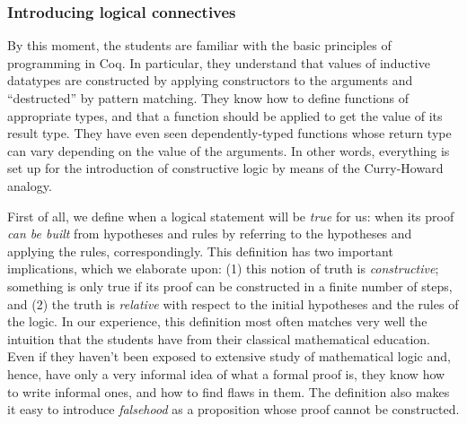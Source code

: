 \documentclass[blockstyle,preprint]{sigplanconf}
\newcommand{\an}[1]{\textcolor{red}{(Aleks: {#1})}}
\begin{document}
\subsubsection{Introducing logical connectives}
\label{sec:intr-logic-conn}

By this moment, the students are familiar with the basic principles of
programming in Coq. In particular, they understand that values of
inductive datatypes are constructed by applying constructors to the
arguments and ``destructed'' by pattern matching. They know how to
define functions of appropriate types, and that a function should be
applied to get the value of its result type. They have even seen
dependently-typed functions whose return type can vary depending on
the value of the arguments. In other words, everything is set up for
the introduction of constructive logic by means of the Curry-Howard
analogy.

First of all, we define when a logical statement will be \emph{true}
for us: when its proof \emph{can be built} from hypotheses and rules
by referring to the hypotheses and applying the rules,
correspondingly. This definition has two important implications, which
we elaborate upon: (1) this notion of truth is \emph{constructive};
something is only true if its proof can be constructed in a finite
number of steps, and (2) the truth is \emph{relative} with respect to
the initial hypotheses and the rules of the logic. In our experience,
this definition most often matches very well the intuition that the
students have from their classical mathematical education. Even if
they haven't been exposed to extensive study of mathematical logic
and, hence, have only a very informal idea of what a formal proof is,
they know how to write informal ones, and how to find flaws in
them. The definition also makes it easy to introduce \emph{falsehood}
as a proposition whose proof cannot be constructed.

\end{document}
